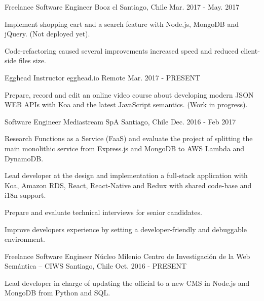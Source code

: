 \begin{cventries}
{    }
  \cventry
    {Freelance Software Engineer}
    {Booz cl}
    {Santiago, Chile}
    {Mar. 2017 - May. 2017}
    {
      \begin{cvitems}
        \item {Implement shopping cart and a search feature with Node.js, MongoDB and jQuery. (Not deployed yet).}
        \item {Code-refactoring caused several improvements increased speed and reduced client-side files size.}
      \end{cvitems}
    }
  \cventry
    {Egghead Instructor}
    {egghead.io}
    {Remote}
    {Mar. 2017 - PRESENT}
    {
      \begin{cvitems}
        \item {Prepare, record and edit an online video course about developing modern JSON WEB APIs with Koa and the latest JavaScript semantics. (Work in progress).}
      \end{cvitems}
    }
  \cventry
    {Software Engineer}
    {Mediastream SpA}
    {Santiago, Chile}
    {Dec. 2016 - Feb 2017}
    {
      \begin{cvitems}
        \item {Research Functions as a Service (FaaS) and evaluate the project of splitting the main monolithic service from Express.js and MongoDB to AWS Lambda and DynamoDB.}
        \item {Lead developer at the design and implementation a full-stack application with Koa, Amazon RDS, React, React-Native and Redux with shared code-base and i18n support.}
        \item {Prepare and evaluate technical interviews for senior candidates.}
        \item {Improve developers experience by setting a developer-friendly and debuggable environment.}
      \end{cvitems}
    }
  \cventry
    {Freelance Software Engineer}
    {Núcleo Milenio Centro de Investigación de la Web Semántica – CIWS}
    {Santiago, Chile}
    {Oct. 2016 - PRESENT}
    {
      \begin{cvitems}
        \item {Lead developer in charge of updating the official to a new CMS in Node.js and MongoDB from Python and SQL.}
      \end{cvitems}
    }
\end{cventries}
